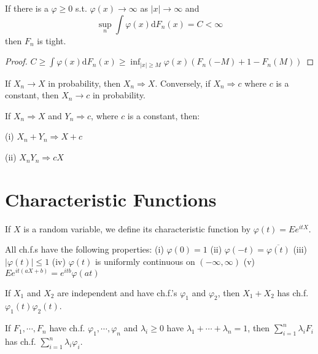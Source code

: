 \begin{corollary}
If there is a $\varphi\ge0$ s.t. $\varphi(x)\to\infty$ as $\left | x \right | \to\infty$ and 
\[\sup_n\int\varphi(x)\mathrm{d}F_n(x)=C<\infty\] then $F_n$ is tight.
\end{corollary}
\begin{proof}
$C\ge\int\varphi(x)\mathrm{d}F_n(x)\ge\inf_{\left | x \right |\ge M}\varphi(x)(F_n(-M)+1-F_n(M))$
\end{proof}
\begin{lemma}
If $X_n\longrightarrow X$ in probability, then $X_n\Longrightarrow X$. Conversely, if $X_n\Longrightarrow c$ where $c$ is a constant, then $X_n\longrightarrow c$ in probability.
\end{lemma}
\begin{theorem}[slutsky]
If $X_n\Longrightarrow X$ and $Y_n\Longrightarrow c$, where $c$ is a constant, then:\par
(i) $X_n+Y_n\Longrightarrow X+c$\par
(ii) $X_nY_n\Longrightarrow cX$
\end{theorem}

\section{Characteristic Functions}
\begin{definition}
    If $X$ is a random variable, we define its characteristic function by $\varphi(t)=Ee^{itX}$.
\end{definition}
\begin{theorem}[properties of ch.f.]
    All ch.f.s have the following properties:\newline 
    (i) $\varphi(0)=1$\newline 
    (ii) $\varphi(-t)=\overline{\varphi(t)}$\newline 
    (iii) $\left|\varphi(t)\right|\le 1$\newline 
    (iv) $\varphi(t)$ is uniformly continuous on $(-\infty,\infty)$\newline 
    (v) $Ee^{it(aX+b)}=e^{itb}\varphi(at)$
\end{theorem}
\begin{theorem}
    If $X_1$ and $X_2$ are independent and have ch.f.'s $\varphi_1$ and $\varphi_2$, then $X_1+X_2$ has ch.f. $\varphi_1(t)\varphi_2(t)$.
\end{theorem}
\begin{lemma}
    If $F_1,\cdots,F_n$ have ch.f. $\varphi_1,\cdots,\varphi_n$ and $\lambda_i\ge 0$ have $\lambda_1+\cdots+\lambda_n=1$, then $\sum_{i=1}^n\lambda_iF_i$ has ch.f. $\sum_{i=1}^n\lambda_i\varphi_i$.
\end{lemma}



